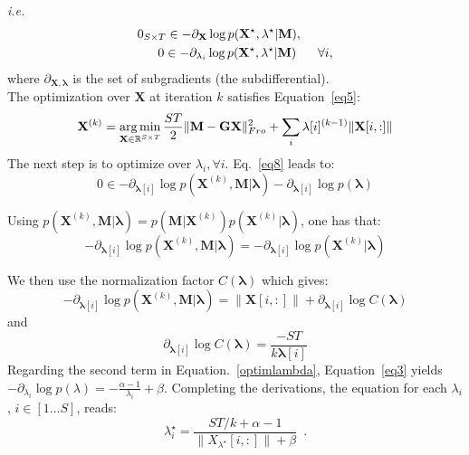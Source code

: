 \textit{i.e.}
\begin{equation} \label{eq8}
\begin{aligned}
0_{S\times T} \in -\partial_{\mathbf{X}} \log p(\mathbf{X^\star}, \lambda^\star|\mathbf{M}), \hspace{9mm} \\
0 \in -\partial_{\lambda_i} \log p(\mathbf{\mathbf{X}^\star}, \lambda^\star|\mathbf{M}) \hspace{6mm} \forall i,
\end{aligned}
\end{equation}
where $\partial_{\mathbf{X},\mathbf{\lambda}}$ is the set of subgradients (the subdifferential).\\

The optimization over $\mathbf{X}$ at iteration $k$ satisfies Equation~\eqref{eq5}: %
\begin{equation*}	
\mathbf{X}^{(k)}=\mathop{\mathrm{arg}\,\mathrm{min}}_{\mathbf{X}\in\mathbb{R}^{S\times T}} \frac{ST}{2}\|\mathbf{M}-\mathbf{GX}\|_{Fro}^2 + \sum_{i} \mathbf{\lambda}[i]^{(k-1)}\|\mathbf{X}[i,:]\|
\end{equation*}
The next step is to optimize over $\lambda_i, \forall i$. Eq.~\eqref{eq8} leads to:
\begin{equation} \label{optimlambda}
0\in -\partial_{\mathbf{\lambda}[i]} \log p(\mathbf{X}^{(k)},\mathbf{M}|\mathbf{\lambda}) -\partial_{\mathbf{\lambda}[i]} \log p(\mathbf{\lambda})
\end{equation} 

Using $p(\mathbf{X}^{(k)},\mathbf{M}|\mathbf{\lambda})=p(\mathbf{M}|\mathbf{X}^{(k)})p(\mathbf{X}^{(k)}|\mathbf{\lambda})$, one has that:
\begin{equation}
-\partial_{\mathbf{\lambda}[i]} \log p(\mathbf{X}^{(k)}, \mathbf{M}|\mathbf{\lambda}) = -\partial_{\mathbf{\lambda}[i]} \log p(\mathbf{X}^{(k)}|\mathbf{\lambda})
\end{equation}

 We then use the normalization factor $C(\mathbf{\lambda})$ which gives:\\
\begin{equation}
 - \partial_{\mathbf{\lambda}[i]} \log p(\mathbf{X}^{(k)}, \mathbf{M}|\mathbf{\lambda})=\|\mathbf{X}[i,:]\| + \partial_{\mathbf{\lambda}[i]} \log C(\mathbf{\lambda})
\end{equation}
 and 
\begin{equation} 
 \partial_{\mathbf{\lambda}[i]} \log C(\mathbf{\lambda})=\frac{-ST}{k\mathbf{\lambda}[i]}
\end{equation} 
  Regarding the second term in Equation.~\eqref{optimlambda}, Equation~\eqref{eq3} yields $-\partial_{\lambda_i} \log p(\lambda) = -\frac{\alpha-1}{\lambda_i} + \beta$.
Completing the derivations, the equation for each $\lambda_i$, $i\in[1\dots S]$, reads:
\begin{equation} \label{eq9}
\lambda^\star_i=\frac{ST/k + \alpha - 1}{\|X_{\lambda^\star}[i,:]\| + \beta} \enspace .
\end{equation}

